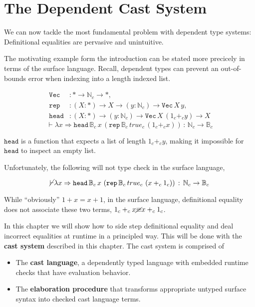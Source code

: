\chapter{The Dependent Cast System}
\label{chapter:Cast}
\thispagestyle{myheadings}

We can now tackle the most fundamental problem with dependent type systems: Definitional equalities are pervasive and unintuitive.

The motivating example form the introduction can be stated more precicely in terms of the surface language.
Recall, dependent types can prevent an out-of-bounds error when indexing into a length indexed list. 

\begin{align*}
\mathtt{Vec} & :*\rightarrow\mathbb{N}_{c}\rightarrow*,\\
\mathtt{rep} & :\left(X:*\right)\rightarrow X\rightarrow\left(y:\mathbb{N}_{c}\right)\rightarrow\mathtt{Vec\,}X\,y,\\
\mathtt{head} & :\left(X:*\right)\rightarrow\left(y:\mathbb{N}_{c}\right)\rightarrow\mathtt{Vec}\,X\,\left(1_{c}+_{c}y\right)\rightarrow X
\end{align*}
\[
\vdash\lambda x\Rightarrow\mathtt{head}\,\mathbb{B}_{c}\,x\,\left(\mathtt{rep}\,\mathbb{B}_{c}\,true_{c}\,\left(1_{c}+_{c}x\right)\right)\,:\,\mathbb{N}_{c}\rightarrow\mathbb{B}_{c}
\]

$\mathtt{head}$ is a function that expects a list of length $1_{c}+_{c}y$, making it impossible for $\mathtt{head}$ to inspect an empty list.

Unfortunately, the following will not type check in the surface language,

\[
\cancel{\vdash}\lambda x\Rightarrow\mathtt{head}\,\mathbb{B}_{c}\,x\,\left(\mathtt{rep}\,\mathbb{B}_{c}\,true_{c}\,\left(x+_{c}1_{c}\right)\right)\,:\,\mathbb{N}_{c}\rightarrow\mathbb{B}_{c}
\]

\sloppy While ``obviously'' $1+x=x+1$, in the surface language, definitional equality does not associate these two terms, $1_{c}+_{c}x\cancel{\equiv}x+_{c}1_{c}$. 

In this chapter we will show how to side step definitional equality and deal incorrect equalities at runtime in a principled way.
This will be done with the \textbf{cast system} described in this chapter.
The cast system is comprised of
\begin{itemize}
\item The \textbf{cast language}, a dependently typed language with embedded runtime checks that have evaluation behavior.
\item The \textbf{elaboration procedure} that transforms appropriate untyped surface syntax into checked cast language terms.
\end{itemize}

